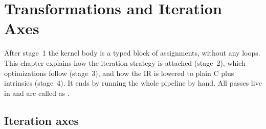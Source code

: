 \chapter{Transformations and Iteration Axes}\label{r01:ch:transformations}

After stage~1 the kernel body is a typed block of assignments, without any loops. This
chapter explains how the iteration strategy is attached (stage~2), which optimizations
follow (stage~3), and how the IR is lowered to plain C plus intrinsics (stage~4). It
ends by running the whole pipeline by hand. All passes live in
 and are called as .

\section{Iteration axes}\label{r01:sec:axes}

